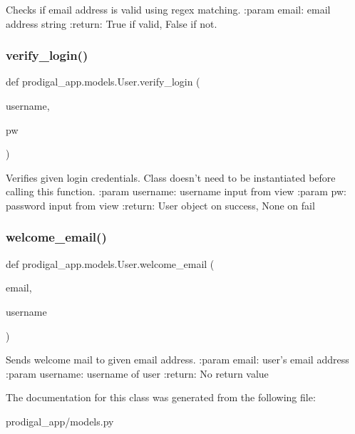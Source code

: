 \begin{DoxyVerb}Checks if email address is valid using regex matching.
:param email: email address string
:return: True if valid, False if not.
\end{DoxyVerb}
 \mbox{\label{classprodigal__app_1_1models_1_1_user_a68a3edc5a30e752a1f87b54b7dbe3a46}} 
\subsubsection{\texorpdfstring{verify\+\_\+login()}{verify\_login()}}
{\footnotesize\ttfamily def prodigal\+\_\+app.\+models.\+User.\+verify\+\_\+login (\begin{DoxyParamCaption}\item[{}]{username,  }\item[{}]{pw }\end{DoxyParamCaption})\hspace{0.3cm}{\ttfamily [static]}}

\begin{DoxyVerb}Verifies given login credentials.
Class doesn't need to be instantiated before calling this function.
:param username: username input from view
:param pw: password input from view
:return: User object on success, None on fail
\end{DoxyVerb}
 \mbox{\label{classprodigal__app_1_1models_1_1_user_ad25d6d4f8c0c53f5ed0ea932d1ab6b60}} 
\subsubsection{\texorpdfstring{welcome\+\_\+email()}{welcome\_email()}}
{\footnotesize\ttfamily def prodigal\+\_\+app.\+models.\+User.\+welcome\+\_\+email (\begin{DoxyParamCaption}\item[{}]{email,  }\item[{}]{username }\end{DoxyParamCaption})\hspace{0.3cm}{\ttfamily [static]}}

\begin{DoxyVerb}Sends welcome mail to given email address.
:param email: user's email address
:param username: username of user
:return: No return value
\end{DoxyVerb}
 

The documentation for this class was generated from the following file\+:\begin{DoxyCompactItemize}
\item 
prodigal\+\_\+app/models.\+py\end{DoxyCompactItemize}

